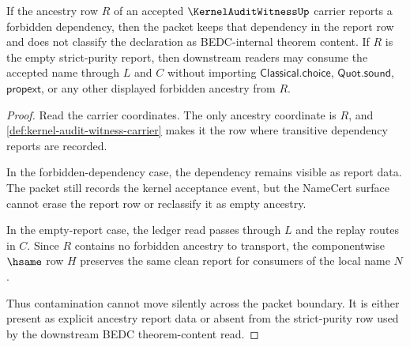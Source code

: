 \begin{theorem}
\label{thm:kernel-audit-witness-non-contamination}
If the ancestry row $R$ of an accepted $\KernelAuditWitnessUp$ carrier reports a forbidden dependency, then the packet keeps that dependency in the report row and does not classify the declaration as BEDC-internal theorem content. If $R$ is the empty strict-purity report, then downstream readers may consume the accepted name through $L$ and $C$ without importing $\mathsf{Classical.choice}$, $\mathsf{Quot.sound}$, $\mathsf{propext}$, or any other displayed forbidden ancestry from $R$.
\end{theorem}
\begin{proof}
Read the carrier coordinates. The only ancestry coordinate is $R$, and \autoref{def:kernel-audit-witness-carrier} makes it the row where transitive dependency reports are recorded.

In the forbidden-dependency case, the dependency remains visible as report data. The packet still records the kernel acceptance event, but the NameCert surface cannot erase the report row or reclassify it as empty ancestry.

In the empty-report case, the ledger read passes through $L$ and the replay routes in $C$. Since $R$ contains no forbidden ancestry to transport, the componentwise $\hsame$ row $H$ preserves the same clean report for consumers of the local name $N$.

Thus contamination cannot move silently across the packet boundary. It is either present as explicit ancestry report data or absent from the strict-purity row used by the downstream BEDC theorem-content read.
\end{proof}

